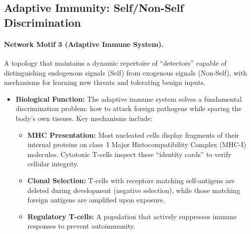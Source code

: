 \subsection{Adaptive Immunity: Self/Non-Self Discrimination}

\paragraph{Network Motif 3 (Adaptive Immune System).}
A topology that maintains a dynamic repertoire of ``detectors'' capable of distinguishing endogenous signals (Self) from exogenous signals (Non-Self), with mechanisms for learning new threats and tolerating benign inputs.

\begin{itemize}[leftmargin=*]
\item \textbf{Biological Function:} The adaptive immune system solves a fundamental discrimination problem: how to attack foreign pathogens while sparing the body's own tissues. Key mechanisms include:
\begin{itemize}
\item \textbf{MHC Presentation:} Most nucleated cells display fragments of their internal proteins on class~I Major Histocompatibility Complex (MHC-I) molecules. Cytotoxic T-cells inspect these ``identity cards'' to verify cellular integrity.
\item \textbf{Clonal Selection:} T-cells with receptors matching self-antigens are deleted during development (negative selection), while those matching foreign antigens are amplified upon exposure.
\item \textbf{Regulatory T-cells:} A population that actively suppresses immune responses to prevent autoimmunity.
\end{itemize}


\end{itemize}
